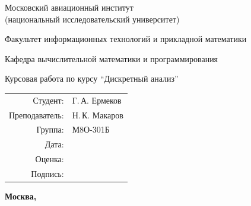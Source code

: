 \begin{titlepage}
\begin{center}
\bfseries

{\Large Московский авиационный институт\\ (национальный исследовательский университет)

}

\vspace{48pt}

{\large Факультет информационных технологий и прикладной математики
}

\vspace{36pt}

{\large Кафедра вычислительной математики и программирования

}


\vspace{48pt}

Курсовая работа по курсу \enquote{Дискретный анализ}

\end{center}

\vspace{72pt}

\begin{flushright}
\begin{tabular}{rl}
Студент: & Г.\,А. Ермеков \\
Преподаватель: & Н.\,К. Макаров \\
Группа: & М8О-301Б \\
Дата: & \\
Оценка: & \\
Подпись: & \\
\end{tabular}
\end{flushright}

\vfill

\begin{center}
\bfseries
Москва, \the\year
\end{center}
\end{titlepage}

\pagebreak
